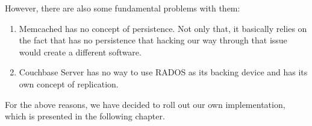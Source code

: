 However, there are also some fundamental problems with them:

\begin{enumerate}
	\item Memcached has no concept of persistence. Not only that, it basically 
		relies on the fact that has no persistence that hacking our way through 
		that issue would create a different software.
	\item Couchbase Server has no way to use RADOS as its backing device and 
		has its own concept of replication.
\end{enumerate}

For the above reasons, we have decided to roll out our own implementation, 
which is presented in the following chapter.

